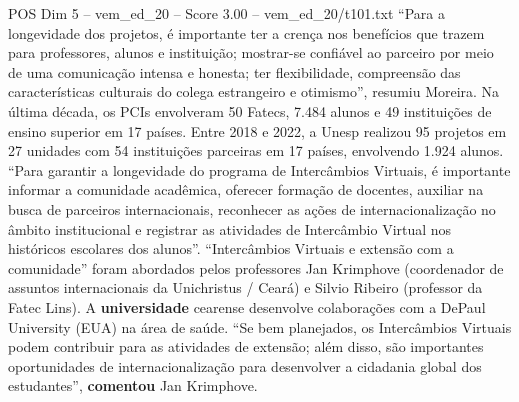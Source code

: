 \begin{textsample}{POS Dim 5 – vem\_ed\_20 – Score 3.00 – vem\_ed\_20/t101.txt}  \label{ex:f5_pos_107}
“Para a longevidade dos projetos, é importante ter a crença nos benefícios que trazem para professores, alunos e instituição; mostrar-se confiável ao parceiro por meio de uma comunicação intensa e honesta; ter flexibilidade, compreensão das características culturais do colega estrangeiro e otimismo”, resumiu Moreira.
Na última década, os PCIs envolveram 50 Fatecs, 7.484 alunos e 49 instituições de ensino superior em 17 países.
Entre 2018 e 2022, a Unesp realizou 95 projetos em 27 unidades com 54 instituições parceiras em 17 países, envolvendo 1.924 alunos. “Para garantir a longevidade do programa de Intercâmbios Virtuais, é importante informar a comunidade acadêmica, oferecer formação de docentes, auxiliar na busca de parceiros internacionais, reconhecer as ações de internacionalização no âmbito institucional e registrar as atividades de Intercâmbio Virtual nos históricos escolares dos alunos”. “Intercâmbios Virtuais e extensão com a comunidade” foram abordados pelos professores Jan Krimphove (coordenador de assuntos internacionais da Unichristus / Ceará) e Silvio Ribeiro (professor da Fatec Lins).
A \textbf{universidade} cearense desenvolve colaborações com a DePaul University (EUA) na área de saúde. “Se bem planejados, os Intercâmbios Virtuais podem contribuir para as atividades de extensão; além disso, são importantes oportunidades de internacionalização para desenvolver a cidadania global dos estudantes”, \textbf{comentou} Jan Krimphove.

\end{textsample}
